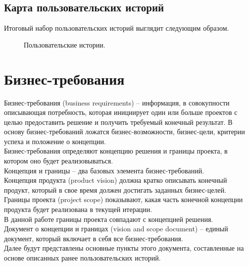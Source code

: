 \documentclass[a4paper,14pt]{extreport} %
\begin{document}
\newpage
\subsection{Карта пользовательских историй}

Итоговый набор пользовательских историй выглядит следующим образом.

\begin{figure}[H]
\caption{Пользовательские истории.}
\label{user-stories}
\end{figure}

\newpage
\section{Бизнес-требования}

Бизнес-требования (business requirements) -- информация, в совокупности описывающая потребность, которая инициирует один или больше проектов с целью предоставить решение и получить требуемый конечный результат. В основу бизнес-требований ложатся бизнес-возможности, бизнес-цели, критерии успеха и положение о концепции. \\
Бизнес-требования определяют концепцию решения и границы проекта, в котором оно будет реализовываться. \\
Концепция и границы -- два базовых элемента бизнес-требований. \\ Концепция продукта (product vision) должна кратко описывать конечный продукт, который в свое время должен достигать заданных бизнес-целей. \\
Границы проекта (project scope) показывают, какая часть конечной концепции продукта будет реализована в текущей итерации. \\
В данной работе границы проекта совпадают с концепцией решения. \\
Документ о концепции и границах (vision and scope document) -- единый документ, который включает в себя все бизнес-требования. \\
Далее будут представлены основные пункты этого документа, составленные на основе описанных ранее пользовательских историй.
\end{document}
